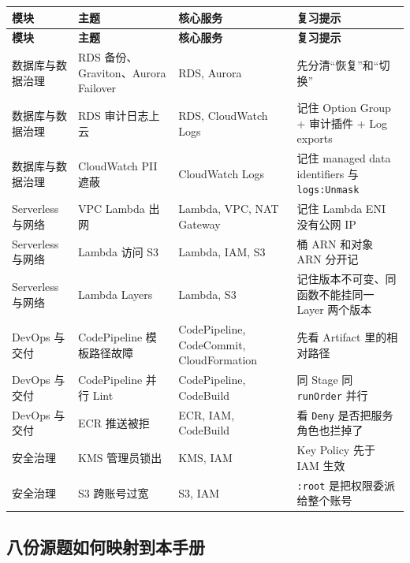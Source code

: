\documentclass[12pt,a4paper]{article}
\begin{document}
\begin{longtable}{L{2.7cm}L{4.0cm}L{3.4cm}L{4.2cm}}
\textbf{模块} & \textbf{主题} & \textbf{核心服务} & \textbf{复习提示} \\
\midrule
\endfirsthead
{}
\textbf{模块} & \textbf{主题} & \textbf{核心服务} & \textbf{复习提示} \\
\midrule
\endhead
数据库与数据治理 & RDS 备份、Graviton、Aurora Failover & RDS, Aurora & 先分清“恢复”和“切换” \\
数据库与数据治理 & RDS 审计日志上云 & RDS, CloudWatch Logs & 记住 Option Group + 审计插件 + Log exports \\
数据库与数据治理 & CloudWatch PII 遮蔽 & CloudWatch Logs & 记住 managed data identifiers 与 \texttt{logs:Unmask} \\
Serverless 与网络 & VPC Lambda 出网 & Lambda, VPC, NAT Gateway & 记住 Lambda ENI 没有公网 IP \\
Serverless 与网络 & Lambda 访问 S3 & Lambda, IAM, S3 & 桶 ARN 和对象 ARN 分开记 \\
Serverless 与网络 & Lambda Layers & Lambda, S3 & 记住版本不可变、同函数不能挂同一 Layer 两个版本 \\
DevOps 与交付 & CodePipeline 模板路径故障 & CodePipeline, CodeCommit, CloudFormation & 先看 Artifact 里的相对路径 \\
DevOps 与交付 & CodePipeline 并行 Lint & CodePipeline, CodeBuild & 同 Stage 同 \texttt{runOrder} 并行 \\
DevOps 与交付 & ECR 推送被拒 & ECR, IAM, CodeBuild & 看 \texttt{Deny} 是否把服务角色也拦掉了 \\
安全治理 & KMS 管理员锁出 & KMS, IAM & Key Policy 先于 IAM 生效 \\
安全治理 & S3 跨账号过宽 & S3, IAM & \texttt{:root} 是把权限委派给整个账号 \\
\bottomrule
\end{longtable}

\subsection{八份源题如何映射到本手册}
\end{document}
